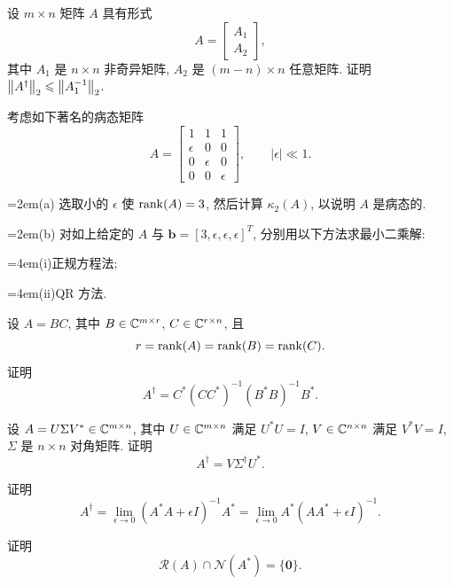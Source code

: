 \begin{exercises}
  \item 设 $m\times n$ 矩阵 $A$ 具有形式
  \[
    A=
    \begin{bmatrix}
      A_1\\
      A_2
    \end{bmatrix},
  \]
  其中 $A_1$ 是 $n\times n$ 非奇异矩阵, $A_2$ 是 $(m-n)\times n$ 任意矩阵. 证明 $\left\|A^{\dagger}\right\|_2\leqslant\left\|A_1^{-1}\right\|_2$.

  \item 考虑如下著名的病态矩阵
  \[
    A=
    \begin{bmatrix}
      1 & 1 & 1\\
      \epsilon & 0 & 0\\
      0 & \epsilon & 0\\
      0 & 0 & \epsilon
    \end{bmatrix},
    \qquad|\epsilon|\ll1.
  \]
  \par\smallskip
  \hangindent=2em\noindent\hspace*{2em}(a)\enspace
  选取小的 $\epsilon$ 使 $\operatorname{rank}(A)=3$, 然后计算 $\kappa_2(A)$, 以说明 $A$ 是病态的.
  \par\smallskip
  \hangindent=2em\noindent\hspace*{2em}(b)\enspace
  对如上给定的 $A$ 与 $\mathbf{b}=[3,\epsilon,\epsilon,\epsilon]^T$, 分别用以下方法求最小二乘解:
  \par\smallskip
  \hangindent=4em\noindent\hspace*{4em}(i)\enspace 正规方程法;
  \par\smallskip
  \hangindent=4em\noindent\hspace*{4em}(ii)\enspace QR 方法.

  \item 设 $A=BC$, 其中 $B\in\mathbb{C}^{m\times r}$, $C\in\mathbb{C}^{r\times n}$, 且
  \[
    r=\operatorname{rank}(A)=\operatorname{rank}(B)=\operatorname{rank}(C).
  \]
  证明
  \[
    A^{\dagger}=C^*(CC^*)^{-1}(B^*B)^{-1}B^*.
  \]

  \item 设 $A=U\Sigma V^*\in\mathbb{C}^{m\times n}$, 其中 $U\in\mathbb{C}^{m\times n}$ 满足 $U^*U=I$, $V\in\mathbb{C}^{n\times n}$ 满足 $V^*V=I$, $\Sigma$ 是 $n\times n$ 对角矩阵. 证明
  \[
    A^{\dagger}=V\Sigma^{\dagger}U^*.
  \]

  \item 证明
  \[
    A^{\dagger}=\lim_{\epsilon\to0}(A^*A+\epsilon I)^{-1}A^*
    =\lim_{\epsilon\to0}A^*(AA^*+\epsilon I)^{-1}.
  \]

  \item 证明
  \[
    \mathcal{R}(A)\cap\mathcal{N}(A^*)=\{\mathbf{0}\}.
  \]


\end{exercises}
